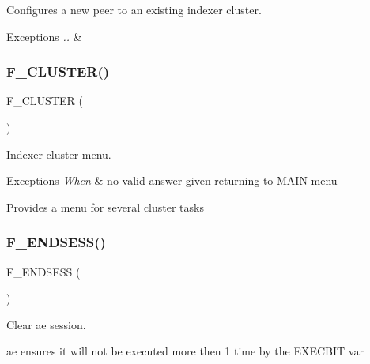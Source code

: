 Configures a new peer to an existing indexer cluster. 


\begin{DoxyExceptions}{Exceptions}
{\em ..} & \\
\hline
\end{DoxyExceptions}
\mbox{\label{ansible__engine_8sh_a404f494374c78e96b2638ab4b727a158}} 
\subsubsection{\texorpdfstring{F\+\_\+\+C\+L\+U\+S\+T\+E\+R()}{F\_CLUSTER()}}
{\footnotesize\ttfamily F\+\_\+\+C\+L\+U\+S\+T\+ER (\begin{DoxyParamCaption}{ }\end{DoxyParamCaption})}



Indexer cluster menu. 


\begin{DoxyExceptions}{Exceptions}
{\em When} & no valid answer given returning to M\+A\+IN menu\\
\hline
\end{DoxyExceptions}
Provides a menu for several cluster tasks \mbox{\label{ansible__engine_8sh_ae32aed87711d2842d25199eda0b2726e}} 
\subsubsection{\texorpdfstring{F\+\_\+\+E\+N\+D\+S\+E\+S\+S()}{F\_ENDSESS()}}
{\footnotesize\ttfamily F\+\_\+\+E\+N\+D\+S\+E\+SS (\begin{DoxyParamCaption}{ }\end{DoxyParamCaption})}



Clear ae session. 

ae ensures it will not be executed more then 1 time by the E\+X\+E\+C\+B\+IT var \mbox{\label{ansible__engine_8sh_a66ec6201aeab8fa5ad0064b93bd4850c}} 
